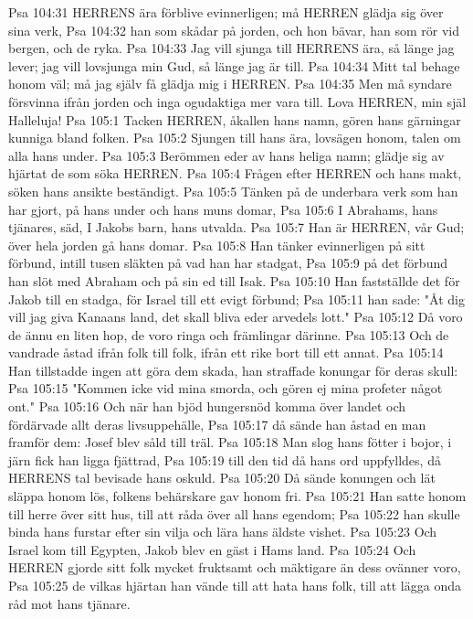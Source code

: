 Psa 104:31  HERRENS ära förblive evinnerligen; må HERREN glädja sig över sina verk,
Psa 104:32  han som skådar på jorden, och hon bävar, han som rör vid bergen, och de ryka.
Psa 104:33  Jag vill sjunga till HERRENS ära, så länge jag lever; jag vill lovsjunga min Gud, så länge jag är till.
Psa 104:34  Mitt tal behage honom väl; må jag själv få glädja mig i HERREN.
Psa 104:35  Men må syndare försvinna ifrån jorden och inga ogudaktiga mer vara till. Lova HERREN, min själ Halleluja!
Psa 105:1  Tacken HERREN, åkallen hans namn, gören hans gärningar kunniga bland folken.
Psa 105:2  Sjungen till hans ära, lovsägen honom, talen om alla hans under.
Psa 105:3  Berömmen eder av hans heliga namn; glädje sig av hjärtat de som söka HERREN.
Psa 105:4  Frågen efter HERREN och hans makt, söken hans ansikte beständigt.
Psa 105:5  Tänken på de underbara verk som han har gjort, på hans under och hans muns domar,
Psa 105:6  I Abrahams, hans tjänares, säd, I Jakobs barn, hans utvalda.
Psa 105:7  Han är HERREN, vår Gud; över hela jorden gå hans domar.
Psa 105:8  Han tänker evinnerligen på sitt förbund, intill tusen släkten på vad han har stadgat,
Psa 105:9  på det förbund han slöt med Abraham och på sin ed till Isak.
Psa 105:10  Han fastställde det för Jakob till en stadga, för Israel till ett evigt förbund;
Psa 105:11  han sade: "Åt dig vill jag giva Kanaans land, det skall bliva eder arvedels lott."
Psa 105:12  Då voro de ännu en liten hop, de voro ringa och främlingar därinne.
Psa 105:13  Och de vandrade åstad ifrån folk till folk, ifrån ett rike bort till ett annat.
Psa 105:14  Han tillstadde ingen att göra dem skada, han straffade konungar för deras skull:
Psa 105:15  "Kommen icke vid mina smorda, och gören ej mina profeter något ont."
Psa 105:16  Och när han bjöd hungersnöd komma över landet och fördärvade allt deras livsuppehälle,
Psa 105:17  då sände han åstad en man framför dem: Josef blev såld till träl.
Psa 105:18  Man slog hans fötter i bojor, i järn fick han ligga fjättrad,
Psa 105:19  till den tid då hans ord uppfylldes, då HERRENS tal bevisade hans oskuld.
Psa 105:20  Då sände konungen och lät släppa honom lös, folkens behärskare gav honom fri.
Psa 105:21  Han satte honom till herre över sitt hus, till att råda över all hans egendom;
Psa 105:22  han skulle binda hans furstar efter sin vilja och lära hans äldste vishet.
Psa 105:23  Och Israel kom till Egypten, Jakob blev en gäst i Hams land.
Psa 105:24  Och HERREN gjorde sitt folk mycket fruktsamt och mäktigare än dess ovänner voro,
Psa 105:25  de vilkas hjärtan han vände till att hata hans folk, till att lägga onda råd mot hans tjänare.
